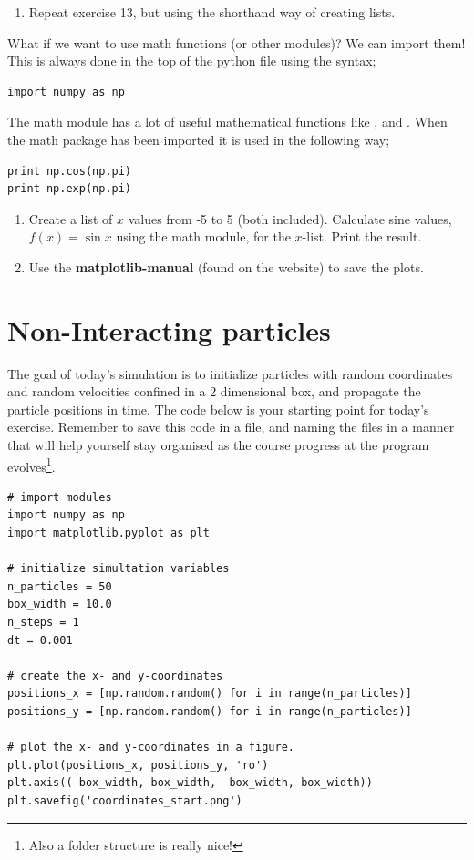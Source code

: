 \documentclass{article}
\begin{document}
\begin{enumerate}[resume]
    \item Repeat exercise 13, but using the shorthand way of creating lists.
\end{enumerate}

What if we want to use math functions (or other modules)?
We can import them! This is always done in the top of the
python file using the syntax;

\begin{lstlisting}
import numpy as np
\end{lstlisting}

The math module has a lot of useful mathematical functions like ,  and .
When the math package has been imported it is used in the following way;

\begin{lstlisting}
print np.cos(np.pi)
print np.exp(np.pi)
\end{lstlisting}

\begin{enumerate}[resume]
    \item Create a list of $x$ values from -5 to 5 (both included).
    Calculate sine values, $f(x) = \sin{x}$ using the math module,
    for the $x$-list.
    Print the result.
    \item Use the \textbf{matplotlib-manual} (found on the website) to save the plots.
\end{enumerate}

%
%
%

\newpage
\section{Non-Interacting particles}

The goal of today's simulation is to initialize particles with random coordinates and random velocities confined in a 2 dimensional box, and propagate the particle positions in time.
%
The code below is your starting point for today's exercise.
Remember to save this code in a  file, and naming the files in a manner that will help yourself stay organised as the course progress at the program evolves\footnote{Also a folder structure is really nice!}.

\begin{lstlisting}
# import modules
import numpy as np
import matplotlib.pyplot as plt

# initialize simultation variables
n_particles = 50
box_width = 10.0
n_steps = 1
dt = 0.001

# create the x- and y-coordinates
positions_x = [np.random.random() for i in range(n_particles)]
positions_y = [np.random.random() for i in range(n_particles)]

# plot the x- and y-coordinates in a figure.
plt.plot(positions_x, positions_y, 'ro')
plt.axis((-box_width, box_width, -box_width, box_width))
plt.savefig('coordinates_start.png')
\end{lstlisting}
\end{document}
